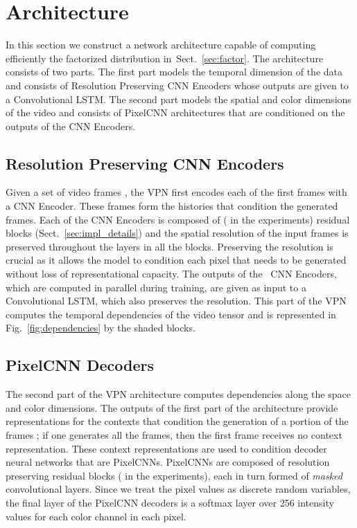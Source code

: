 \documentclass{article}
\newcommand{\figref}[1]{Fig.~\ref{#1}}
\newcommand{\sref}[1]{Sect.~\ref{#1}}
\begin{document}
\section{Architecture}
\label{sec:arch}

In this section we construct a network architecture capable of computing efficiently the factorized distribution in~\sref{sec:factor}. The architecture consists of two parts. The first part models the temporal dimension of the data and consists of Resolution Preserving CNN Encoders whose outputs are given to a Convolutional LSTM. The second part models the spatial and color dimensions of the video and consists of PixelCNN architectures \citep{van2016pixel,DBLP:journals/corr/OordKVEGK16} that are conditioned on the outputs of the CNN Encoders. 



\subsection{Resolution Preserving CNN Encoders}
Given a set of video frames , the VPN first encodes each of the first  frames  with a CNN Encoder. These frames form the histories that condition the generated frames. Each of the CNN Encoders is composed of  ( in the experiments) residual blocks (Sect.~\ref{sec:impl_details}) and the spatial resolution of the input frames is preserved throughout the layers in all the blocks. Preserving the resolution is crucial as it allows the model to condition each pixel that needs to be generated without loss of representational capacity. The outputs of the~ CNN Encoders, which are computed in parallel during training, are given as input to a Convolutional LSTM, which also preserves the resolution. This part of the VPN computes the temporal dependencies of the video tensor and is represented in \figref{fig:dependencies} by the shaded blocks.

\subsection{PixelCNN Decoders}
\label{sec:temp_stream}
The second part of the VPN architecture computes dependencies along the space and color dimensions. The  outputs of the first part of the architecture provide representations for the contexts that condition the generation of a portion of the  frames ; if one generates all the  frames, then the first frame  receives no context representation. These context representations are used to condition decoder neural networks that are PixelCNNs. PixelCNNs are composed of  resolution preserving residual blocks ( in the experiments), each in turn formed of \emph{masked} convolutional layers. Since we treat the pixel values as discrete random variables, the final layer of the PixelCNN decoders is a softmax layer over 256 intensity values for each color channel in each pixel. 
\end{document}
